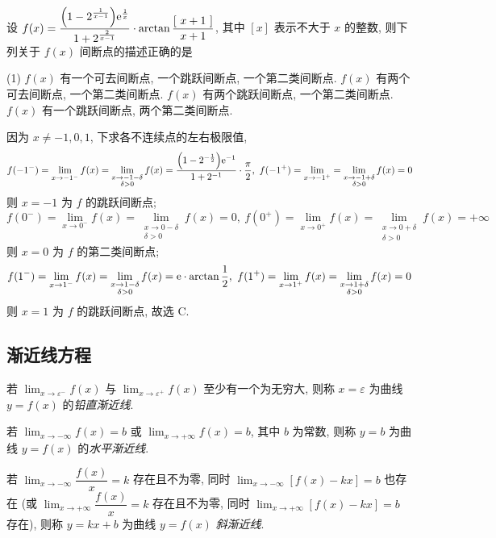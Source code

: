 \begin{example}
    设 $f(x)=\dfrac{\qty(1-2^{\frac{1}{x-1}})\mathrm{e}^{\frac{1}{x}}}{1+2^{\frac{2}{x-1}}}\cdot\arctan\dfrac{[~x+1~]}{x+1}$, 其中 $[x]$ 表示不大于 $x$ 的整数, 则下列关于 $f(x)$ 间断点的描述正确的是
    \begin{tasks}(1)
        \task $f(x)$ 有一个可去间断点, 一个跳跃间断点, 一个第二类间断点.
        \task $f(x)$ 有两个可去间断点, 一个第二类间断点.
        \task $f(x)$ 有两个跳跃间断点, 一个第二类间断点.
        \task $f(x)$ 有一个跳跃间断点, 两个第二类间断点.
    \end{tasks}
\end{example}
\begin{solution}
    因为 $x\neq-1,0,1$, 下求各不连续点的左右极限值,
    $$f(-1^-)=\lim_{x\to-1^-}f(x)=\lim_{\substack{x\to-1-\delta\\\delta>0}}f(x)=\dfrac{\qty(1-2^{-\frac{1}{2}})\mathrm{e}^{-1}}{1+2^{-1}}\cdot\dfrac{\pi}{2},~f(-1^+)=\lim_{x\to-1^+}=\lim_{\substack{x\to-1+\delta\\\delta>0}}f(x)=0$$
    则 $x=-1$ 为 $f$ 的跳跃间断点;
    $$f(0^-)=\lim_{x\to0^-}f(x)=\lim_{\substack{x\to0-\delta\\\delta>0}}f(x)=0,~f(0^+)=\lim_{x\to0^+}f(x)=\lim_{\substack{x\to0+\delta\\\delta>0}}f(x)=+\infty$$
    则 $x=0$ 为 $f$ 的第二类间断点;
    $$f(1^-)=\lim_{x\to1^-}f(x)=\lim_{\substack{x\to1-\delta\\\delta>0}}f(x)=\mathrm{e}\cdot\arctan\dfrac{1}{2},~f(1^+)=\lim_{x\to1^+}f(x)=\lim_{\substack{x\to1+\delta\\\delta>0}}f(x)=0$$
    则 $x=1$ 为 $f$ 的跳跃间断点, 故选 C.
\end{solution}

\subsection{渐近线方程}

\begin{definition}[铅直渐近线]
    若 $\displaystyle\lim_{x\to\varepsilon^-}f(x)$ 与 $\displaystyle \lim_{x\to\varepsilon^+}f(x)$ 至少有一个为无穷大, 则称 $x=\varepsilon$ 为曲线 $y=f(x)$ 的\textit{铅直渐近线}.
\end{definition}
\begin{definition}[水平渐近线]
    若 $\displaystyle\lim_{x\to-\infty}f(x)=b$ 或 $\displaystyle\lim_{x\to+\infty}f(x)=b$, 其中 $b$ 为常数, 则称 $y=b$ 为曲线 $y=f(x)$ 的\textit{水平渐近线}.
\end{definition}
\begin{definition}[斜渐近线]
    若 $\displaystyle\lim_{x\to-\infty}\dfrac{f(x)}{x}=k$ 存在且不为零, 同时 $\displaystyle\lim_{x\to-\infty}[f(x)-kx]=b$ 也存在 (或 $\displaystyle\lim_{x\to+\infty}\dfrac{f(x)}{x}=k$ 存在且不为零, 同时 $\displaystyle\lim_{x\to+\infty}[f(x)-kx]=b$ 存在),
    则称 $y=kx+b$ 为曲线 $y=f(x)$ \textit{斜渐近线}.
\end{definition}

